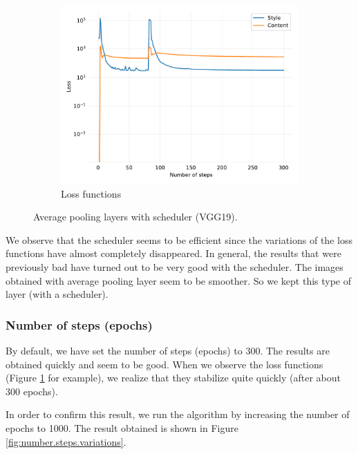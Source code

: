 \documentclass[twocolumn,superscriptaddress,aps, floatfix]{revtex4-1}
\begin{document}
\begin{figure}[ht]
\begin{subfigure}[b]{0.22\textwidth}
            \includegraphics[width=\textwidth]{resources/pdf/architecture/sun-trees-paris-avgpool-scheduler.pdf}
            \caption{Loss functions}
        \end{subfigure}
        \caption{Average pooling layers with scheduler (VGG19).}
        \label{fig:model.architecture.loss.scheduler}
    \end{figure}
    
    We observe that the scheduler seems to be efficient since the variations of the loss functions have almost completely disappeared. In general, the results that were previously bad have turned out to be very good with the scheduler. The images obtained with average pooling layer seem to be smoother. So we kept this type of layer (with a scheduler).
    
    \subsubsection{Number of steps (epochs)}
    
    By default, we have set the number of steps (epochs) to 300. The results are obtained quickly and seem to be good. When we observe the loss functions (Figure \ref{fig:model.architecture.loss.scheduler} for example), we realize that they stabilize quite quickly (after about 300 epochs).
    
    In order to confirm this result, we run the algorithm by increasing the number of epochs to 1000. The result obtained is shown in Figure \ref{fig:number.steps.variations}.
    
\end{document}
